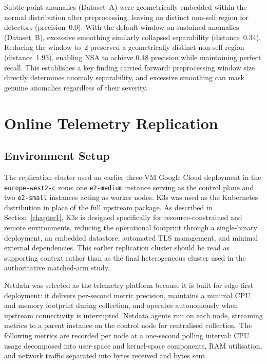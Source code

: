 Subtle point anomalies (Dataset~A) were geometrically embedded within the normal distribution after preprocessing, leaving no distinct non-self region for detectors (precision~0.0). With the default window on sustained anomalies (Dataset~B), excessive smoothing similarly collapsed separability (distance~0.34). Reducing the window to~2 preserved a geometrically distinct non-self region (distance~1.93), enabling NSA to achieve 0.48 precision while maintaining perfect recall. This establishes a key finding carried forward: preprocessing window size directly determines anomaly separability, and excessive smoothing can mask genuine anomalies regardless of their severity.

\section{Online Telemetry Replication}

\subsection{Environment Setup}

The replication cluster used an earlier three-VM Google Cloud deployment in the \texttt{europe-west2-c} zone: one \texttt{e2-medium} instance serving as the control plane and two \texttt{e2-small} instances acting as worker nodes. K3s was used as the Kubernetes distribution in place of the full upstream package. As described in Section~\ref{chapter1}, K3s is designed specifically for resource-constrained and remote environments, reducing the operational footprint through a single-binary deployment, an embedded datastore, automated TLS management, and minimal external dependencies. This earlier replication cluster should be read as supporting context rather than as the final heterogeneous cluster used in the authoritative matched-arm study.

Netdata was selected as the telemetry platform because it is built for edge-first deployment: it delivers per-second metric precision, maintains a minimal CPU and memory footprint during collection, and operates autonomously when upstream connectivity is interrupted. Netdata agents run on each node, streaming metrics to a parent instance on the control node for centralised collection. The following metrics are recorded per node at a one-second polling interval: CPU usage decomposed into user-space and kernel-space components, RAM utilisation, and network traffic separated into bytes received and bytes sent.

